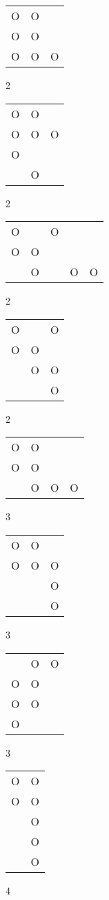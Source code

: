 \begin{tabular}{|m{0.2cm}m{0.2cm}m{0.2cm}|}\hline
O&O& \\
O&O& \\
O&O&O\\
\hline\end{tabular}2
\begin{tabular}{|m{0.2cm}m{0.2cm}m{0.2cm}|}\hline
O&O& \\
O&O&O\\
O& & \\
 &O& \\
\hline\end{tabular}2
\begin{tabular}{|m{0.2cm}m{0.2cm}m{0.2cm}m{0.2cm}m{0.2cm}|}\hline
O& &O& & \\
O&O& & & \\
 &O& &O&O\\
\hline\end{tabular}2
\begin{tabular}{|m{0.2cm}m{0.2cm}m{0.2cm}|}\hline
O& &O\\
O&O& \\
 &O&O\\
 & &O\\
\hline\end{tabular}2
\begin{tabular}{|m{0.2cm}m{0.2cm}m{0.2cm}m{0.2cm}|}\hline
O&O& & \\
O&O& & \\
 &O&O&O\\
\hline\end{tabular}3
\begin{tabular}{|m{0.2cm}m{0.2cm}m{0.2cm}|}\hline
O&O& \\
O&O&O\\
 & &O\\
 & &O\\
\hline\end{tabular}3
\begin{tabular}{|m{0.2cm}m{0.2cm}m{0.2cm}|}\hline
 &O&O\\
O&O& \\
O&O& \\
O& & \\
\hline\end{tabular}3
\begin{tabular}{|m{0.2cm}m{0.2cm}|}\hline
O&O\\
O&O\\
 &O\\
 &O\\
 &O\\
\hline\end{tabular}4
